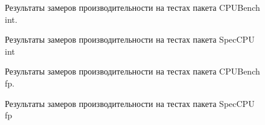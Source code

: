\begin{figure}[ht]
	\caption{Результаты замеров производительности на тестах  пакета CPUBench int.}\label{fig:spubench_int_speedup}
\end{figure}

\begin{figure}[ht]
	\caption{Результаты замеров производительности на тестах пакета SpecCPU int}\label{fig:spec_int_speedup}
\end{figure}

\begin{figure}[ht]
	\caption{Результаты замеров производительности на тестах  пакета CPUBench fp.}\label{fig:pubench_fp_speedup}
\end{figure}

\begin{figure}[ht]
	\caption{Результаты замеров производительности на тестах пакета SpecCPU fp}\label{fig:spec_fp_speedup}
\end{figure}


